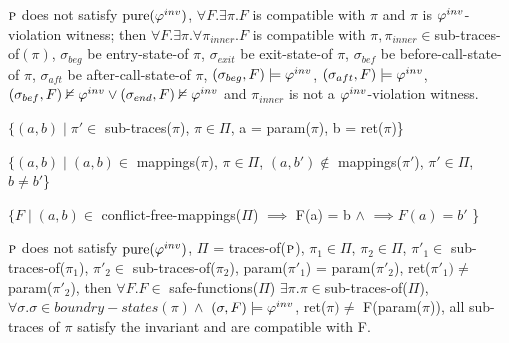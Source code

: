 \documentclass{llncs}
\begin{document}
\begin{lemma}
  $\textsc{p}$ does not satisfy $\mathrm{pure}(\varphi^{inv})$,
  $\forall F. \exists \pi. F$ is compatible with $\pi$ and $\pi$ is $\varphi^{inv}$-violation witness;
  then $\forall F. \exists \pi. \forall \pi_{inner}. F$ is compatible with $\pi, \pi_{inner} \in $sub-traces-of$(\pi)$,
  $\sigma_{beg}$ be entry-state-of $\pi$,
  $\sigma_{exit}$ be exit-state-of $\pi$,
  $\sigma_{bef}$ be before-call-state-of $\pi$,
  $\sigma_{aft}$ be after-call-state-of $\pi$,
  $(\sigma_{beg}, F) \models \varphi^{inv}$,
  $(\sigma_{aft}, F) \models \varphi^{inv}$,
  $(\sigma_{bef}, F) \nvDash \varphi^{inv} \vee (\sigma_{end}, F) \nvDash\varphi^{inv}$
  and $\pi_{inner}$ is not a $\varphi^{inv}$-violation witness.
\end{lemma}

\begin{definition}
  $\{(a,b) \mid \pi' \in$ sub-traces($\pi$), $\pi \in \Pi$, a =
  param($\pi$), b = ret($\pi$)\} 
\end{definition}

\begin{definition}
  $\{(a,b) \mid (a,b) \in $ mappings($\pi$),
  $\pi \in \Pi$,
  $(a, b') \not \in$ mappings($\pi'$),
  $\pi' \in \Pi$, 
  $b \neq b'$\}
\end{definition}

\begin{definition}
  $\{F  \mid (a,b) \in$ conflict-free-mappings($\Pi$)
  $\implies$ F(a) = b $\wedge$
  $ \implies F(a) = b'$
  \}
\end{definition}

\begin{lemma}
  $\textsc{p}$ does not satisfy $\mathrm{pure}(\varphi^{inv})$, $\Pi$ = traces-of($\textsc{p}$),
  $\pi_1 \in \Pi$,
  $\pi_2 \in \Pi$,
  $\pi'_1 \in$ sub-traces-of($\pi_1$),
  $\pi'_2 \in$ sub-traces-of($\pi_2$),
  param($\pi'_1$) = param($\pi'_2$),
  ret($\pi'_1) \neq$ param($\pi'_2$),
  then
  $\forall F. F \in$ safe-functions($\Pi$) $\exists \pi. \pi \in $sub-traces-of($\Pi$),
  $\forall \sigma. \sigma \in boundry-states(\pi) \wedge$
  $(\sigma, F) \models \varphi^{inv}$,
  ret($\pi) \neq$ F(param($\pi$)),
  all sub-traces of $\pi$ satisfy the invariant and are compatible
  with F.
\end{lemma}
\end{document}
